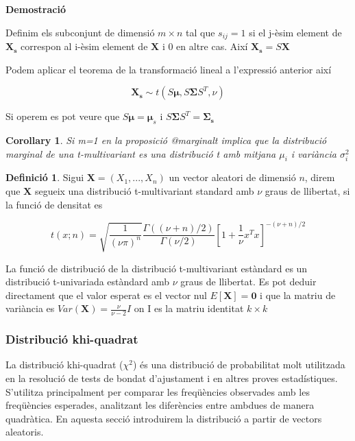 \documentclass[
  catalan,
]{article}
\newtheorem{corollary}{Corollary}[section]
\theoremstyle{definition}
\newtheorem{definition}{Definició}[section]
\theoremstyle{definition}
\theoremstyle{definition}
\theoremstyle{definition}
\theoremstyle{remark}
\begin{document}
\textbf{Demostració}

Definim els subconjunt de dimensió \(m \times n\) tal que \(s_{ij}=1\) si el j-èsim element de \(\mathbf{X_s}\) correspon al i-èsim element de \(\mathbf{X}\) i \(0\) en altre cas. Així \(\mathbf{X_s}=S\mathbf{X}\)

Podem aplicar el teorema de la transformació lineal a l'expressió anterior així

\[
\mathbf{X_s} \sim t(S \boldsymbol{\mu},S \boldsymbol{\Sigma} S^T,\nu) 
\]

Si operem es pot veure que \(S \boldsymbol{\mu}=\boldsymbol{\mu}_s\) i \(S \boldsymbol{\Sigma} S^T=\boldsymbol{\Sigma_s}\)

\begin{corollary}
Si m=1 en la proposició @marginalt implica que la distribució marginal de una t-multivariant es una distribució t amb mitjana \(\mu_i\) i variància \(\sigma_i^2\)
\end{corollary}

\begin{definition}
Sigui \(\mathbf{X}=(X_1,...,X_n)\) un vector aleatori de dimensió \(n\), direm que \(\mathbf{X}\) segueix una distribució t-multivariant standard amb \(\nu\) graus de llibertat, si la funció de densitat es

\[
t(x;n)=\sqrt{\dfrac {1}{(\nu\pi)^n }} \dfrac {\Gamma((\nu+n)/2)}{\Gamma(\nu/2)} \left[ 1+\dfrac {1}{\nu} x^T  x  \right]^{-(\nu+n)/2}   \label{eq:fxymultit2}
\]
\end{definition}

La funció de distribució de la distribució t-multivariant estàndard es un distribució t-univariada estàndard amb \(\nu\) graus de llibertat. Es pot deduir directament que el valor esperat es el vector nul \(E[\mathbf{X}]=\mathbf{0}\) i que la matriu de variància es \(Var(\mathbf{X}) = \frac {\nu}{\nu-2} I\) on I es la matriu identitat \(k \times k\)

\subsubsection{Distribució khi-quadrat}\label{distribuciuxf3-khi-quadrat}

La distribució khi-quadrat (\(\chi^2\)) és una distribució de probabilitat molt utilitzada en la resolució de tests de bondat d'ajustament i en altres proves estadístiques. S'utilitza principalment per comparar les freqüències observades amb les freqüències esperades, analitzant les diferències entre ambdues de manera quadràtica. En aquesta secció introduirem la distribució a partir de vectors aleatoris.
\end{document}
